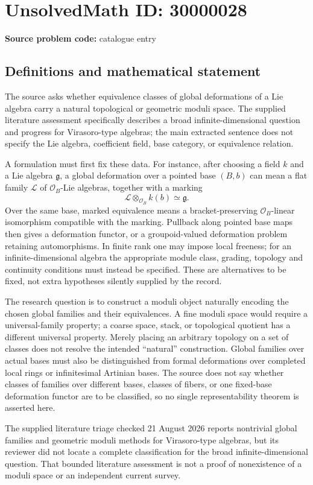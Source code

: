 \documentclass[11pt]{article}
\begin{document}
\section*{UnsolvedMath ID: 30000028}
\textbf{Source problem code:} catalogue entry
\subsection{Definitions and mathematical statement}
The source asks whether equivalence classes of global deformations of a Lie algebra carry a natural topological or geometric moduli space. The supplied literature assessment specifically describes a broad infinite-dimensional question and progress for Virasoro-type algebras; the main extracted sentence does not specify the Lie algebra, coefficient field, base category, or equivalence relation.

A formulation must first fix these data. For instance, after choosing a field $k$ and a Lie algebra $\mathfrak g$, a global deformation over a pointed base $(B,b)$ can mean a flat family $\mathcal L$ of $\mathcal O_B$-Lie algebras, together with a marking
\[
 \mathcal L\otimes_{\mathcal O_B}k(b)\simeq\mathfrak g.
\]
Over the same base, marked equivalence means a bracket-preserving $\mathcal O_B$-linear isomorphism compatible with the marking. Pullback along pointed base maps then gives a deformation functor, or a groupoid-valued deformation problem retaining automorphisms. In finite rank one may impose local freeness; for an infinite-dimensional algebra the appropriate module class, grading, topology and continuity conditions must instead be specified. These are alternatives to be fixed, not extra hypotheses silently supplied by the record.

The research question is to construct a moduli object naturally encoding the chosen global families and their equivalences. A fine moduli space would require a universal-family property; a coarse space, stack, or topological quotient has a different universal property. Merely placing an arbitrary topology on a set of classes does not resolve the intended ``natural'' construction. Global families over actual bases must also be distinguished from formal deformations over completed local rings or infinitesimal Artinian bases. The source does not say whether classes of families over different bases, classes of fibers, or one fixed-base deformation functor are to be classified, so no single representability theorem is asserted here.

The supplied literature triage checked 21 August 2026 reports nontrivial global families and geometric moduli methods for Virasoro-type algebras, but its reviewer did not locate a complete classification for the broad infinite-dimensional question. That bounded literature assessment is not a proof of nonexistence of a moduli space or an independent current survey.
\end{document}
